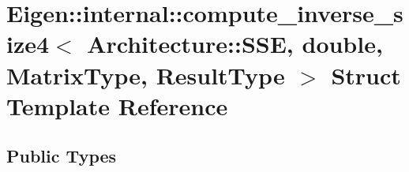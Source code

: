 \hypertarget{struct_eigen_1_1internal_1_1compute__inverse__size4_3_01_architecture_1_1_s_s_e_00_01double_00_0ae07abd87bb6c7ddc3170cf276579ed0}{}\section{Eigen\+:\+:internal\+:\+:compute\+\_\+inverse\+\_\+size4$<$ Architecture\+:\+:S\+SE, double, Matrix\+Type, Result\+Type $>$ Struct Template Reference}
\label{struct_eigen_1_1internal_1_1compute__inverse__size4_3_01_architecture_1_1_s_s_e_00_01double_00_0ae07abd87bb6c7ddc3170cf276579ed0}
\subsection*{Public Types}
